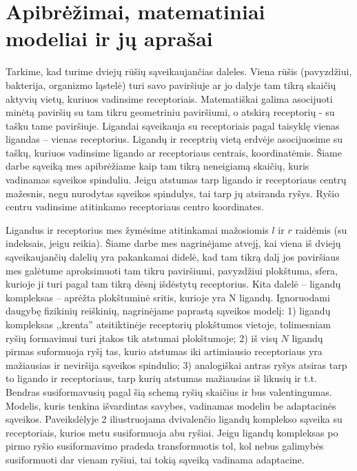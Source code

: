 \documentclass[10pt]{article}
\begin{document}
\section{Apibrėžimai, matematiniai modeliai ir jų aprašai}

Tarkime, kad turime dviejų rūšių sąveikaujančias daleles. Viena rūšis (pavyzdžiui, bakterija, organizmo ląstelė) turi savo paviršiuje ar jo dalyje tam tikrą skaičių aktyvių vietų, kuriuos  vadinsime receptoriais. Matematiškai galima asocijuoti minėtą paviršių su tam tikru geometriniu paviršiumi, o atskirą receptorių -  su tašku tame paviršiuje. Ligandai  sąveikauja su receptoriais pagal taisyklę vienas ligandas – vienas receptorius.  Ligandų ir receptrių vietą erdvėje asocijuosime su taškų, kuriuos vadinsime ligando ar receptoriaus centrais, koordinatėmis. Šiame darbe sąveiką mes apibrėžiame kaip tam tikrą neneigiamą skaičių, kuris vadinamas sąveikos spinduliu. Jeigu atstumas tarp ligando ir receptoriaus centrų mažesnis, negu nurodytas sąveikos spindulys, tai tarp jų atsiranda ryšys. Ryšio centru vadinsime atitinkamo receptoriaus centro koordinates.

Ligandus ir receptorius mes žymėsime atitinkamai  mažosiomis  $l$ ir $r$ raidėmis (su indeksais, jeigu reikia). Šiame darbe mes nagrinėjame atvejį, kai viena iš dviejų sąveikaujančių dalelių yra pakankamai didelė, kad tam tikrą dalį jos paviršiaus mes galėtume aproksimuoti tam tikru paviršiumi, pavyzdžiui  plokštuma, sfera, kurioje ji turi  pagal tam tikrą dėsnį išdėstytų  receptorius. Kita dalelė – ligandų kompleksas –  aprėžta plokštuminė sritis, kurioje yra N  ligandų. Ignoruodami daugybę fizikinių  reiškinių, nagrinėjame paprastą  sąveikos  modelį: 
       1)   ligandų kompleksas ,,krenta'' atsitiktinėje receptorių plokštumos vietoje, tolimesniam ryšių formavimui turi įtakos tik atstumai plokštumoje;
        	2)    iš visų $N$ ligandų pirmas suformuoja ryšį tas, kurio atstumas iki artimiausio receptoriaus yra  mažiausias ir neviršija sąveikos spindulio;
            	3)  analogiškai antras ryšys atsiras tarp to ligando ir receptoriaus, tarp kurių atstumas mažiausias iš likusių ir t.t.  
          Bendras susiformavusių pagal šią schemą ryšių skaičius  ir bus valentingumas. Modelis, kuris tenkina išvardintas savybes, vadinamas modeliu  be adaptacinės sąveikos. Paveikslėlyje 2 iliustruojama dvivalenčio ligandų komplekso sąveika su receptoriais, kurios metu susiformuoja  abu ryšiai. Jeigu ligandų kompleksas po pirmo ryšio susiformavimo pradeda transformuotis tol, kol nebus galimybės susiformuoti dar vienam ryšiui, tai tokią sąveiką vadinama  adaptacine.  
          
\end{document}

